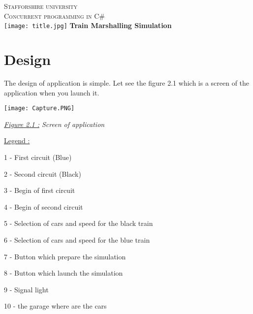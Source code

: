 \documentclass[12pt]{article}
\begin{document}
  \begin{titlepage}
  \centering
      {\LARGE \textsc{Stafforshire university}}\\
      \textsc{Concurrent programming in C\#}\\
    \vspace{1cm}
    \vspace{1cm}
    \texttt{[image: title.jpg]}
    \vfill
       {\LARGE \textbf{ Train Marshalling Simulation}} \\
    \vspace{2em}
    \vfill
  \end{titlepage}

\tableofcontents

\newpage

\section{Design}

\quad

The design of application is simple. Let see the figure 2.1 which is a screen of the application when you launch it.

\quad
\begin{center}

\texttt{[image: Capture.PNG]}

\quad

\textit{\underline{Figure 2.1 :} Screen of application}
\end{center}

\underline{Legend :}

\quad

1 - First circuit (Blue) 

2 - Second circuit (Black) 

3 - Begin of first circuit

4 - Begin of second circuit

5 - Selection of cars and speed for the black train

6 - Selection of cars and speed for the blue train

7 - Button which prepare the simulation 

8 - Button which launch the simulation	

9 - Signal light

10 - the garage where are the cars

\newpage 
\end{document}
